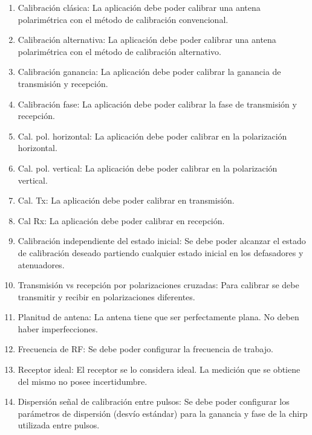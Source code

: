 \begin{enumerate}
    \item Calibración clásica: La aplicación debe poder calibrar una antena polarimétrica con el método de calibración convencional.

    \item Calibración alternativa: La aplicación debe poder calibrar una antena polarimétrica con el método de calibración alternativo.

    \item Calibración ganancia: La aplicación debe poder calibrar la ganancia de transmisión y recepción.

    \item Calibración fase: La aplicación debe poder calibrar la fase de transmisión y recepción.

    \item Cal. pol. horizontal: La aplicación debe poder calibrar en la polarización horizontal.
    \item Cal. pol. vertical: La aplicación debe poder calibrar en la polarización vertical.
    \item Cal. Tx: La aplicación debe poder calibrar en transmisión.
    \item Cal Rx: La aplicación debe poder calibrar en recepción.

    \item Calibración independiente del estado inicial: Se debe poder alcanzar el estado de calibración deseado partiendo
		cualquier estado inicial en los defasadores y atenuadores.

    \item Transmisión vs recepción por polarizaciones cruzadas: Para calibrar se debe transmitir y recibir en polarizaciones
		diferentes.

    \item Planitud de antena: La antena tiene que ser perfectamente plana. No deben haber imperfecciones.

    \item Frecuencia de RF: Se debe poder configurar la frecuencia de trabajo.

	\item Receptor ideal: El receptor se lo considera ideal. La medición que se obtiene del mismo no posee incertidumbre.

    \item Dispersión señal de calibración entre pulsos: Se debe poder configurar los parámetros de dispersión (desvío estándar) para
		la ganancia y fase de la chirp utilizada entre pulsos.


\end{enumerate}
